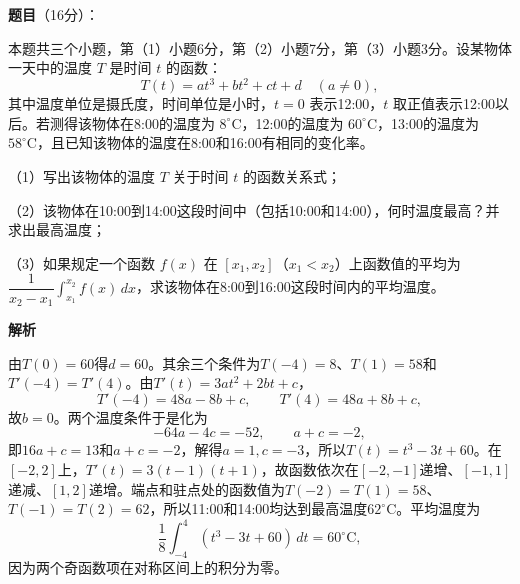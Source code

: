 \begin{answer}

\textbf{题目}（16分）：

本题共三个小题，第（1）小题6分，第（2）小题7分，第（3）小题3分。设某物体一天中的温度 $T$ 是时间 $t$ 的函数：
\nopagebreak[4]
\[
T(t)=at^3+bt^2+ct+d\quad(a\ne0),
\]
其中温度单位是摄氏度，时间单位是小时，$t=0$ 表示12:00，$t$ 取正值表示12:00以后。若测得该物体在8:00的温度为 $8^\circ\mathrm C$，12:00的温度为 $60^\circ\mathrm C$，13:00的温度为 $58^\circ\mathrm C$，且已知该物体的温度在8:00和16:00有相同的变化率。

（1）写出该物体的温度 $T$ 关于时间 $t$ 的函数关系式；

（2）该物体在10:00到14:00这段时间中（包括10:00和14:00），何时温度最高？并求出最高温度；

（3）如果规定一个函数 $f(x)$ 在 $[x_1,x_2]$（$x_1<x_2$）上函数值的平均为 $\dfrac1{x_2-x_1}\int_{x_1}^{x_2}f(x)\,dx$，求该物体在8:00到16:00这段时间内的平均温度。

\textbf{解析}

由$T(0)=60$得$d=60$。其余三个条件为$T(-4)=8$、$T(1)=58$和$T'(-4)=T'(4)$。由$T'(t)=3at^2+2bt+c$，
\nopagebreak[4]
\[
T'(-4)=48a-8b+c,\qquad T'(4)=48a+8b+c,
\]
故$b=0$。两个温度条件于是化为
\nopagebreak[4]
\[
-64a-4c=-52,\qquad a+c=-2,
\]
即$16a+c=13$和$a+c=-2$，解得$a=1,c=-3$，所以$T(t)=t^3-3t+60$。在$[-2,2]$上，$T'(t)=3(t-1)(t+1)$，故函数依次在$[-2,-1]$递增、$[-1,1]$递减、$[1,2]$递增。端点和驻点处的函数值为$T(-2)=T(1)=58$、$T(-1)=T(2)=62$，所以11:00和14:00均达到最高温度$62^\circ\mathrm C$。平均温度为
\nopagebreak[4]
\[
\frac18\int_{-4}^{4}(t^3-3t+60)\,dt=60^\circ\mathrm C,
\]
因为两个奇函数项在对称区间上的积分为零。


\end{answer}
